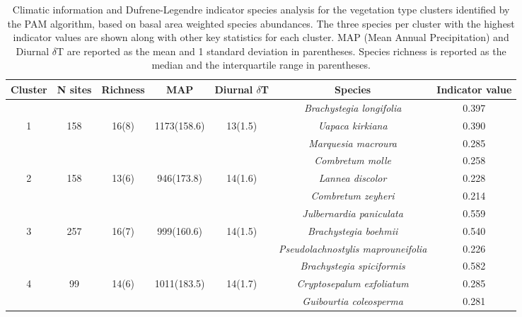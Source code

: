 \begin{table}[H]
\centering
\begin{tabular}{ccccccc}
  \hline
Cluster & N sites & Richness & MAP & Diurnal $\delta$T & Species & Indicator value \\ 
  \hline
 &  &  &  &  & \textit{Brachystegia longifolia} & 0.397 \\ 
  1 & 158 & 16(8) & 1173(158.6) & 13(1.5) & \textit{Uapaca kirkiana} & 0.390 \\ 
   &  &  &  &  & \textit{Marquesia macroura} & 0.285 \\ 
   \hline
 &  &  &  &  & \textit{Combretum molle} & 0.258 \\ 
  2 & 158 & 13(6) & 946(173.8) & 14(1.6) & \textit{Lannea discolor} & 0.228 \\ 
   &  &  &  &  & \textit{Combretum zeyheri} & 0.214 \\ 
   \hline
 &  &  &  &  & \textit{Julbernardia paniculata} & 0.559 \\ 
  3 & 257 & 16(7) & 999(160.6) & 14(1.5) & \textit{Brachystegia boehmii} & 0.540 \\ 
   &  &  &  &  & \textit{Pseudolachnostylis maprouneifolia} & 0.226 \\ 
   \hline
 &  &  &  &  & \textit{Brachystegia spiciformis} & 0.582 \\ 
  4 & 99 & 14(6) & 1011(183.5) & 14(1.7) & \textit{Cryptosepalum exfoliatum} & 0.285 \\ 
   &  &  &  &  & \textit{Guibourtia coleosperma} & 0.281 \\ 
   \hline
\end{tabular}
\caption{Climatic information and Dufrene-Legendre indicator species analysis for the vegetation type clusters identified by the PAM algorithm, based on basal area weighted species abundances. The three species per cluster with the highest indicator values are shown along with other key statistics for each cluster. MAP (Mean Annual Precipitation) and Diurnal $\delta$T are reported as the mean and 1 standard deviation in parentheses. Species richness is reported as the median and the interquartile range in parentheses.} 
\label{clust_summ}
\end{table}

